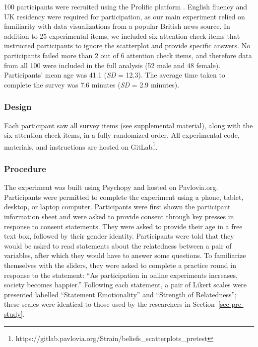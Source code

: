 \documentclass[sigconf]{acmart}
\begin{document}
100 participants were recruited using the Prolific platform
\citep{prolific}. English fluency and UK residency were required for
participation, as our main experiment relied on familiarity with data
visualizations from a popular British news source. In addition to 25
experimental items, we included six attention check items that
instructed participants to ignore the scatterplot and provide specific
answers. No participants failed more than 2 out of 6 attention check
items, and therefore data from all 100 were included in the full
analysis (52 male and 48 female). Participants' mean age was 41.1
(\emph{SD} = 12.3). The average time taken to complete the survey was
7.6 minutes (\emph{SD} = 2.9 minutes).

\subsubsection{Design}\label{sec-design-pre}

Each participant saw all survey items (see supplemental material), along
with the six attention check items, in a fully randomized order. All
experimental code, materials, and instructions are hosted on
GitLab\footnote{https://gitlab.pavlovia.org/Strain/beliefs\_scatterplots\_pretest}.

\subsubsection{Procedure}\label{sec-procedure-pre}

The experiment was built using Psychopy \citep{pierce_2019} and hosted
on Pavlovia.org. Participants were permitted to complete the experiment
using a phone, tablet, desktop, or laptop computer. Participants were
first shown the participant information sheet and were asked to provide
consent through key presses in response to consent statements. They were
asked to provide their age in a free text box, followed by their gender
identity. Participants were told that they would be asked to read
statements about the relatedness between a pair of variables, after
which they would have to answer some questions. To familiarize
themselves with the sliders, they were asked to complete a practice
round in response to the statement: ``As participation in online
experiments increases, society becomes happier.'' Following each
statement, a pair of Likert scales were presented labelled ``Statement
Emotionality'' and ``Strength of Relatedness''; these scales were
identical to those used by the researchers in
Section~\ref{sec-pre-study}.
\end{document}
